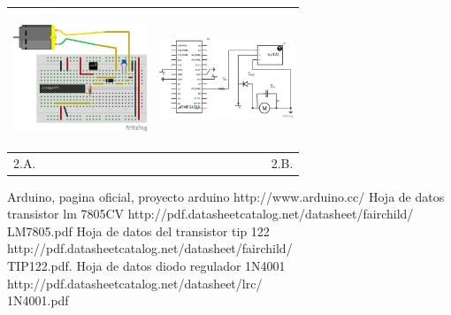 \documentclass[12]{article}
\newenvironment{Figure}
{\par\medskip\noindent\minipage{\linewidth}}
{\endminipage\par\medskip}
\begin{document}
\begin{multicols}{2}
\begin{Figure}
\center
\begin{tabular}{|l|r|}
\hline
\includegraphics[width=4cm, height=4cm]{img/montajemot.png} & \includegraphics[width=4cm, height=4cm]{img/esquemamotor.png} \\ \hline
2.A. & 2.B. \\ \hline
\end{tabular}
\label{fig:g2}
\end{Figure}




\begin{thebibliography}{99}
 Arduino, pagina oficial, proyecto arduino http://www.arduino.cc/
 Hoja de datos  transistor lm 7805CV http://pdf.datasheetcatalog.net/datasheet/fairchild/\\LM7805.pdf
 Hoja de datos del transistor tip 122 http://pdf.datasheetcatalog.net/datasheet/fairchild/\\TIP122.pdf.
  Hoja de datos diodo regulador 1N4001 http://pdf.datasheetcatalog.net/datasheet/lrc/\\1N4001.pdf
\end{thebibliography}
\end{multicols}
\end{document}
